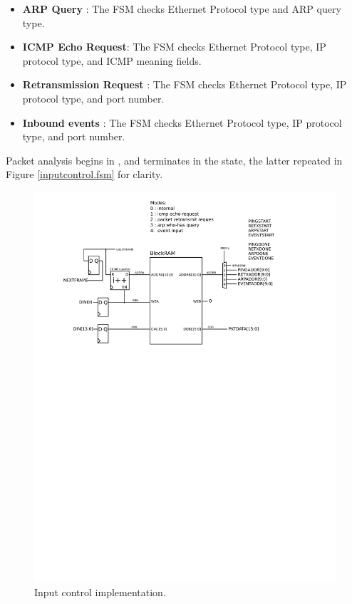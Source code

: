\begin{itemize}
\item \textbf{ARP Query} : The FSM checks Ethernet Protocol type and
  ARP query type.
\item \textbf{ICMP Echo Request}: The FSM checks Ethernet Protocol
  type, IP protocol type, and ICMP meaning fields.
\item \textbf{Retransmission Request} : The FSM checks Ethernet
  Protocol type, IP protocol type, and port number.
\item \textbf{Inbound events} : The FSM checks Ethernet Protocol type,
  IP protocol type, and port number.
\end{itemize}

Packet analysis begins in , and terminates in the
 state, the latter repeated in Figure
\ref{inputcontrol.fsm} for clarity.

\begin{figure}
\begin{centering}
\includegraphics[scale=0.8]{inputcontrol.svg}
\end{centering}
\caption{Input control implementation.}
\label{inputcontrol}
\end{figure}

